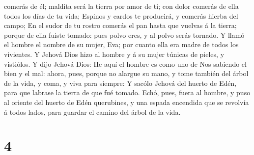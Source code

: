 comerás de él; maldita será la tierra por amor de ti; con dolor comerás
de ella todos los días de tu vida;  Espinos y cardos te
producirá, y comerás hierba del campo;  En el sudor de tu
rostro comerás el pan hasta que vuelvas á la tierra; porque de ella
fuiste tomado: pues polvo eres, y al polvo serás tornado. 
Y llamó el hombre el nombre de su mujer, Eva; por cuanto ella era madre
de todos los vivientes.  Y Jehová Dios hizo al hombre y á
su mujer túnicas de pieles, y vistiólos.  Y dijo Jehová
Dios: He aquí el hombre es como uno de Nos sabiendo el bien y el mal:
ahora, pues, porque no alargue su mano, y tome también del árbol de la
vida, y coma, y viva para siempre:  Y sacólo Jehová del
huerto de Edén, para que labrase la tierra de que fué tomado.
 Echó, pues, fuera al hombre, y puso al oriente del huerto
de Edén querubines, y una espada encendida que se revolvía á todos
lados, para guardar el camino del árbol de la vida.

\hypertarget{section-3}{%
\section{4}\label{section-3}}

